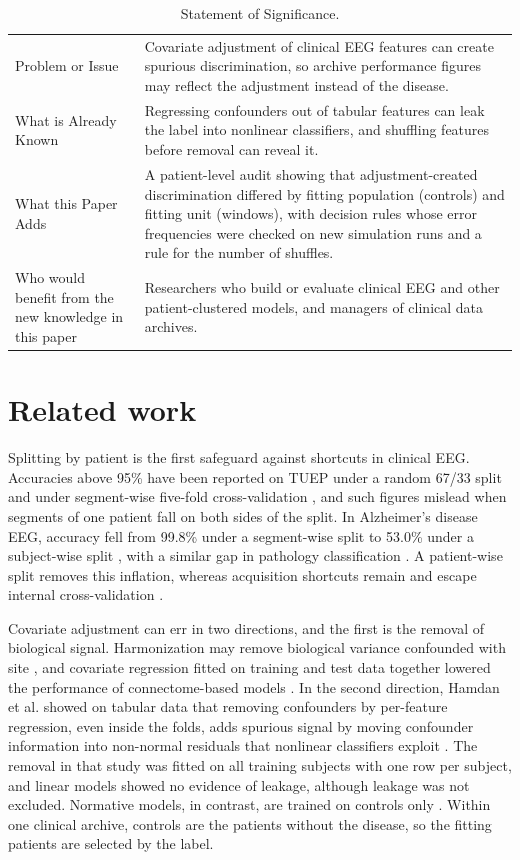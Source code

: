 \documentclass[final,1p,times]{elsarticle}
\begin{document}
\begin{table}[t]
\caption{Statement of Significance.}\label{tab:signifikansi}
\centering\small
\begin{tabular}{p{}p{}}
\toprule
Problem or Issue & Covariate adjustment of clinical EEG features can create spurious discrimination, so archive performance figures may reflect the adjustment instead of the disease. \\
What is Already Known & Regressing confounders out of tabular features can leak the label into nonlinear classifiers, and shuffling features before removal can reveal it. \\
What this Paper Adds & A patient-level audit showing that adjustment-created discrimination differed by fitting population (controls) and fitting unit (windows), with decision rules whose error frequencies were checked on new simulation runs and a rule for the number of shuffles. \\
Who would benefit from the new knowledge in this paper & Researchers who build or evaluate clinical EEG and other patient-clustered models, and managers of clinical data archives. \\
\bottomrule
\end{tabular}
\end{table}%
\section{Related work}\label{sec:related}

Splitting by patient is the first safeguard against shortcuts in clinical EEG. Accuracies above 95\% have been reported on TUEP under a random 67/33 split \cite{rohira2023} and under segment-wise five-fold cross-validation \cite{tang2024}, and such figures mislead when segments of one patient fall on both sides of the split. In Alzheimer's disease EEG, accuracy fell from 99.8\% under a segment-wise split to 53.0\% under a subject-wise split \cite{brookshire2024}, with a similar gap in pathology classification \cite{delpup2025}. A patient-wise split removes this inflation, whereas acquisition shortcuts remain and escape internal cross-validation \cite{ongly2024}.

Covariate adjustment can err in two directions, and the first is the removal of biological signal. Harmonization may remove biological variance confounded with site \cite{bayer2022frontneurol}, and covariate regression fitted on training and test data together lowered the performance of connectome-based models \cite{rosenblatt2024}. In the second direction, Hamdan et al. showed on tabular data that removing confounders by per-feature regression, even inside the folds, adds spurious signal by moving confounder information into non-normal residuals that nonlinear classifiers exploit \cite{hamdan2023}. The removal in that study was fitted on all training subjects with one row per subject, and linear models showed no evidence of leakage, although leakage was not excluded. Normative models, in contrast, are trained on controls only \cite{rutherford2022,bayer2022neuroimage,kia2022}. Within one clinical archive, controls are the patients without the disease, so the fitting patients are selected by the label.
\end{document}
